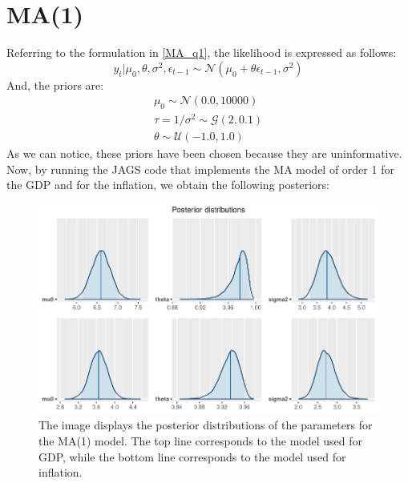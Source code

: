 \section*{MA(1)}
\label{MA(1)}
Referring to the formulation in \ref{MA_q1}, the likelihood is expressed as follows:
$$
y_t | \mu_0, \theta, \sigma^2, \epsilon_{t-1} \sim \mathcal{N}(\mu_0 + \theta \epsilon_{t-1},\sigma^2)
$$
And, the priors are:
\begin{equation}
    \begin{split}
        \mu_0 \sim \mathcal{N}(0.0, 10000) \\
        \tau = 1 / \sigma^2 \sim \mathcal{G}(2, 0.1) \\
        \theta \sim \mathcal{U}(-1.0, 1.0)
    \end{split}
\end{equation}
As we can notice, these priors have been chosen because they are uninformative. \\
Now, by running the JAGS code that implements the MA model of order 1 for the GDP and for the inflation, we obtain the following posteriors:
\begin{figure}[h]
    \centering
    \includegraphics[width=\textwidth]{images/3-MA/posteriors.png}
    \caption{The image displays the posterior distributions of the parameters for the MA(1) model. The top line corresponds to the model used for GDP, while the bottom line corresponds to the model used for inflation.}
    \label{fig:MA_posteriors}
\end{figure}


